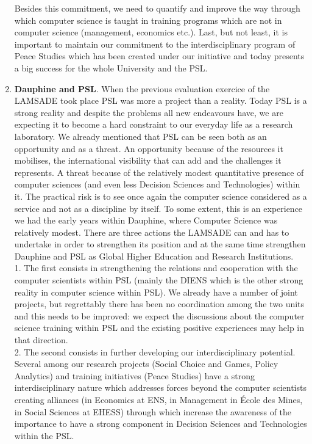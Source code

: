 \begin{enumerate}
      Besides this commitment, we need to quantify and improve the way through which computer science is taught in training programs which are not in computer science (management, economics etc.). Last, but not least, it is important to maintain our commitment to the interdisciplinary program of Peace Studies which has been created under our initiative and today presents a big success for the whole University and the PSL.
  \item \textbf{Dauphine and PSL}. When the previous evaluation exercice of the LAMSADE took place PSL was more a project than a reality. Today PSL is a strong reality and despite the problems all new endeavours have, we are expecting it to become a hard constraint to our everyday life as a research laboratory. We already mentioned that PSL can be seen both as an opportunity and as a threat. An opportunity because of the resources it mobilises, the international visibility that can add and the challenges it represents. A threat because of the relatively modest quantitative presence of computer sciences (and even less Decision Sciences and Technologies) within it. The practical risk is to see once again the computer science considered as a service and not as a discipline by itself. To some extent, this is an experience we had the early years within Dauphine, where Computer Science was relatively modest. There are three actions the LAMSADE can and has to undertake in order to strengthen its position and at the same time strengthen Dauphine and PSL as Global Higher Education and Research Institutions. \\
      1. The first consists in strengthening the relations and cooperation with the computer scientists within PSL (mainly the DIENS which is the other strong reality in computer science within PSL). We already have a number of joint projects, but regrettably there has been no coordination among the two units and this needs to be improved: we expect the discussions about the computer science training within PSL and the existing positive experiences may help in that direction. \\
      2. The second consists in further developing our interdisciplinary potential. Several among our research projects (Social Choice and Games, Policy Analytics) and training initiatives (Peace Studies) have a strong interdisciplinary nature which addresses forces beyond the computer scientists creating alliances (in Economics at ENS, in Management in École des Mines, in Social Sciences at EHESS) through which increase the awareness of the importance to have a strong component in Decision Sciences and Technologies within the PSL. \\

\end{enumerate}
